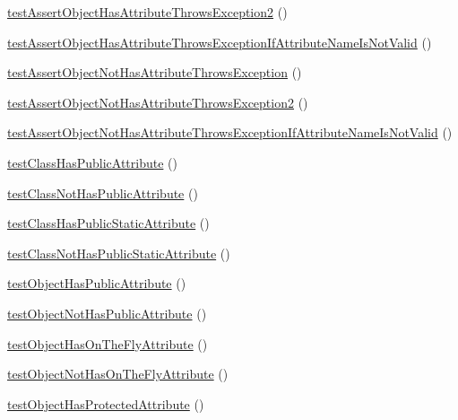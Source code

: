 \begin{DoxyCompactItemize}
\item 
\mbox{\hyperlink{class_framework___assert_test_aacfdef7925593c8464b42d0d3e8f76e9}{test\+Assert\+Object\+Has\+Attribute\+Throws\+Exception2}} ()
\item 
\mbox{\hyperlink{class_framework___assert_test_a915e8d7ef23642585c9c48bffb3998c9}{test\+Assert\+Object\+Has\+Attribute\+Throws\+Exception\+If\+Attribute\+Name\+Is\+Not\+Valid}} ()
\item 
\mbox{\hyperlink{class_framework___assert_test_a0c4b631c2d3c146d974f82bb02c72051}{test\+Assert\+Object\+Not\+Has\+Attribute\+Throws\+Exception}} ()
\item 
\mbox{\hyperlink{class_framework___assert_test_a64704927aa5206b787de733ce1e23b64}{test\+Assert\+Object\+Not\+Has\+Attribute\+Throws\+Exception2}} ()
\item 
\mbox{\hyperlink{class_framework___assert_test_a9d953a1ea6c75ee8dcb617b55e97d0f3}{test\+Assert\+Object\+Not\+Has\+Attribute\+Throws\+Exception\+If\+Attribute\+Name\+Is\+Not\+Valid}} ()
\item 
\mbox{\hyperlink{class_framework___assert_test_afacbf0556236640e6baef1af7c35755f}{test\+Class\+Has\+Public\+Attribute}} ()
\item 
\mbox{\hyperlink{class_framework___assert_test_a0bd9d1e5ff2e383b28f8e61f25e09098}{test\+Class\+Not\+Has\+Public\+Attribute}} ()
\item 
\mbox{\hyperlink{class_framework___assert_test_ae81b4ae4301c27f6ab1e19d01c1baca7}{test\+Class\+Has\+Public\+Static\+Attribute}} ()
\item 
\mbox{\hyperlink{class_framework___assert_test_a9c93a8b60a52418d9f3e37eca3bdc8dd}{test\+Class\+Not\+Has\+Public\+Static\+Attribute}} ()
\item 
\mbox{\hyperlink{class_framework___assert_test_a5927954f4fb1b5b68c31e6739e0c5946}{test\+Object\+Has\+Public\+Attribute}} ()
\item 
\mbox{\hyperlink{class_framework___assert_test_a1ade9ca2fb60d8d480f1d49fbba48d74}{test\+Object\+Not\+Has\+Public\+Attribute}} ()
\item 
\mbox{\hyperlink{class_framework___assert_test_a38d22985a9851a1ef52decc3c2703a0f}{test\+Object\+Has\+On\+The\+Fly\+Attribute}} ()
\item 
\mbox{\hyperlink{class_framework___assert_test_a463d9f69d36c01f54e33404eb3bafc5a}{test\+Object\+Not\+Has\+On\+The\+Fly\+Attribute}} ()
\item 
\mbox{\hyperlink{class_framework___assert_test_a352d13b0c26480b373d876b9ac29c0b1}{test\+Object\+Has\+Protected\+Attribute}} ()

\end{DoxyCompactItemize}
